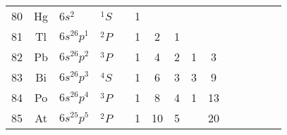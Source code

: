 \begin{table}
\begin{center}
\begin{tabular}{cclcccccccccccc}
80&Hg & $6s^2     $&$^1S$&& 1  &    &   &     &    &   &   &    &    &     \\
81&Tl & $6s^26p^1$ &$^2P$&& 1  & 2  & 1 &     &    &   &   &    &    &     \\
82&Pb & $6s^26p^2$ &$^3P$&& 1  & 4  & 2 &  1  &3   &   &   &    &    &     \\
83&Bi & $6s^26p^3$ &$^4S$&& 1  & 6  & 3 &  3  &9   &   &   &    &    &     \\
84&Po & $6s^26p^4$ &$^3P$&& 1  & 8  & 4 &  1  &13  &   &   &    &    &     \\ 
85&At & $6s^25p^5$ &$^2P$&& 1  & 10 & 5 &     &20  &   &   &    &    &     \\
\hline
\end{tabular}
\end{center}
\end{table}
